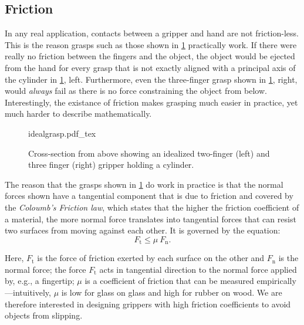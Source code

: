 \subsection{Friction}\label{sec:grasping_friction}

In any real application, contacts between a gripper and hand are not friction-less. This is the reason grasps such as those shown in \cref{fig:idealgrasp} practically work. If there were really no friction between the fingers and the object, the object would be ejected from the hand for every grasp that is not exactly aligned with a principal axis of the cylinder in \cref{fig:idealgrasp}, left. Furthermore, even the three-finger grasp shown in \cref{fig:idealgrasp}, right, would \textsl{always} fail as there is no force constraining the object from below. Interestingly, the existance of friction makes grasping much easier in practice, yet much harder to describe mathematically.

\begin{figure}
    \def\svgwidth{\textwidth}
    {idealgrasp.pdf_tex}
    \caption{Cross-section from above showing an idealized two-finger (left) and three finger (right) gripper holding a cylinder.\label{fig:idealgrasp}
   }
\end{figure}

The reason that the grasps shown in \cref{fig:idealgrasp} do work in practice is that the normal forces shown have a tangential component that is due to friction and covered by the \textsl{Coloumb's Friction law},
which states that the higher the friction coefficient of a material, the more normal force translates into tangential forces that can resist two surfaces from moving against each other.
It is governed by the equation:
\begin{equation}
F_\mathrm{t} \leq \mu\ F_\mathrm{n}.
\end{equation}

Here, $F_\mathrm{t}$  is the force of friction exerted by each surface on the other and $F_\mathrm{n}$ is the normal force; the force $F_\mathrm{t}$ acts in tangential direction to the normal force applied by, e.g., a fingertip; $\mu$ is a coefficient of friction that can be measured empirically---intuitively, $\mu$ is low for glass on glass and high for rubber on wood.
We are therefore interested in designing grippers with high friction coefficients to avoid objects from slipping.

